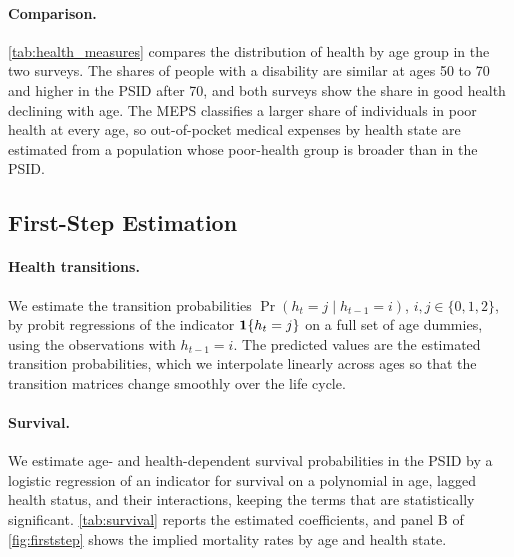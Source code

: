 \paragraph{Comparison.} \autoref{tab:health_measures} compares the distribution of health by age group in the two surveys. The shares of people with a disability are similar at ages 50 to 70 and higher in the PSID after 70, and both surveys show the share in good health declining with age. The MEPS classifies a larger share of individuals in poor health at every age, so out-of-pocket medical expenses by health state are estimated from a population whose poor-health group is broader than in the PSID.

\begin{table}[!htbp]
\centering
\caption{Health Status by Age in the MEPS and the PSID}\label{tab:health_measures}
\small

\end{table}

\subsection{First-Step Estimation}\label{app:firststep}

\paragraph{Health transitions.} We estimate the transition probabilities $\Pr(h_t=j\mid h_{t-1}=i)$, $i,j\in\{0,1,2\}$, by probit regressions of the indicator $\mathbf{1}\{h_t=j\}$ on a full set of age dummies, using the observations with $h_{t-1}=i$. The predicted values are the estimated transition probabilities, which we interpolate linearly across ages so that the transition matrices change smoothly over the life cycle.

\paragraph{Survival.} We estimate age- and health-dependent survival probabilities in the PSID by a logistic regression of an indicator for survival on a polynomial in age, lagged health status, and their interactions, keeping the terms that are statistically significant. \autoref{tab:survival} reports the estimated coefficients, and panel B of \autoref{fig:firststep} shows the implied mortality rates by age and health state.

